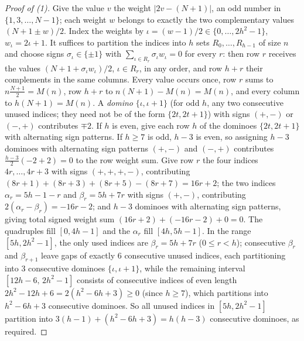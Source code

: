 \begin{proof}[Proof of (1)]
Give the value $v$ the weight $|2v-(N+1)|$, an odd number in $\{1,3,\dots,N-1\}$; each weight $w$ belongs to exactly the two complementary values $(N+1\pm w)/2$.
Index the weights by $\iota=(w-1)/2\in\{0,\dots,2h^2-1\}$, $w_\iota=2\iota+1$.
It suffices to partition the indices into $h$ sets $R_0,\dots,R_{h-1}$ of size $n$ and choose signs $\sigma_\iota\in\{\pm1\}$ with $\sum_{\iota\in R_r}\sigma_\iota w_\iota=0$ for every $r$: then row $r$ receives the values $(N+1+\sigma_\iota w_\iota)/2$, $\iota\in R_r$, in any order, and row $h+r$ their complements in the same columns.
Every value occurs once, row $r$ sums to $n\frac{N+1}2=M(n)$, row $h+r$ to $n(N+1)-M(n)=M(n)$, and every column to $h(N+1)=M(n)$.
A \emph{domino} $\{\iota,\iota+1\}$ (for odd $h$, any two consecutive unused indices; they need not be of the form $\{2t,2t+1\}$) with signs $(+,-)$ or $(-,+)$ contributes $\mp2$.
If $h$ is even, give each row $h$ of the dominoes $\{2t,2t+1\}$ with alternating sign patterns.
If $h\ge7$ is odd, $h-3$ is even, so assigning $h-3$ dominoes with alternating sign patterns $(+,-)$ and $(-,+)$ contributes $\frac{h-3}{2}(-2+2)=0$ to the row weight sum.
Give row $r$ the four indices $4r,\dots,4r+3$ with signs $(+,+,+,-)$, contributing $(8r+1)+(8r+3)+(8r+5)-(8r+7)=16r+2$; the two indices $\alpha_r=5h-1-r$ and $\beta_r=5h+7r$ with signs $(+,-)$, contributing $2(\alpha_r-\beta_r)=-16r-2$; and $h-3$ dominoes with alternating sign patterns, giving total signed weight sum $(16r+2)+(-16r-2)+0=0$.
The quadruples fill $[0,4h-1]$ and the $\alpha_r$ fill $[4h,5h-1]$.
In the range $[5h, 2h^2-1]$, the only used indices are $\beta_r = 5h+7r$ ($0\le r < h$); consecutive $\beta_r$ and $\beta_{r+1}$ leave gaps of exactly $6$ consecutive unused indices, each partitioning into $3$ consecutive dominoes $\{\iota,\iota+1\}$, while the remaining interval $[12h-6,\,2h^2-1]$ consists of consecutive indices of even length $2h^2-12h+6 = 2(h^2-6h+3) \ge 0$ (since $h\ge7$), which partitions into $h^2-6h+3$ consecutive dominoes.
So all unused indices in $[5h, 2h^2-1]$ partition into $3(h-1)+(h^2-6h+3)=h(h-3)$ consecutive dominoes, as required.
\end{proof}

